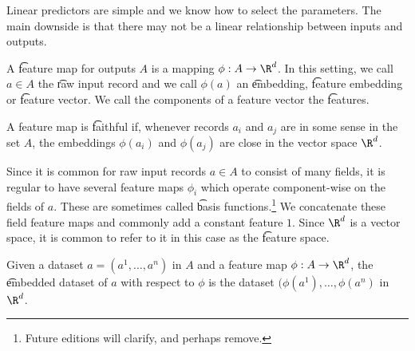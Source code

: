 

Linear predictors are simple and we know how to select the parameters.
The main downside is that there may not be a linear relationship between inputs and outputs.


A \t{feature map} for outputs $A$ is a mapping $\phi: A \to \R^d$.
In this setting, we call $a \in A$ the \t{raw input record} and we call $\phi(a)$ an \t{embedding}, \t{feature embedding} or \t{feature vector}.
We call the components of a feature vector the \t{features}.

A feature map is \t{faithful} if, whenever records $a_i$ and $a_j$ are in some sense  in the set $A$, the embeddings $\phi(a_i)$ and $\phi(a_j)$ are close in the vector space $\R^d$.

Since it is common for raw input records $a \in A$ to consist of many fields, it is regular to have several feature maps $\phi_i$ which operate component-wise on the fields of $a$.
These are sometimes called \t{basis functions}.\footnote{Future editions will clarify, and perhaps remove.}
We concatenate these field feature maps and commonly add a constant feature $1$.
Since $\R^d$ is a vector space, it is common to refer to it in this case as the \t{feature space}.

Given a dataset $a = (a^1, \dots, a^n)$ in $A$ and a feature map $\phi: A \to \R^d$, the \t{embedded dataset} of $a$ with respect to $\phi$ is the dataset $(\phi(a^1), \dots, \phi(a^n)$ in $\R^d$.

\blankpage
